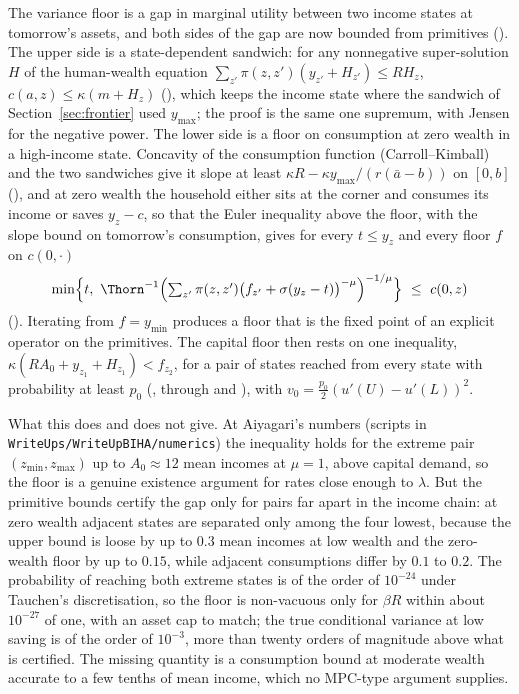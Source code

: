 The variance floor is a gap in marginal utility between two income states at tomorrow's assets,
and both sides of the gap are now bounded from primitives ().
The upper side is a state-dependent sandwich: for any nonnegative super-solution $H$ of the
human-wealth equation $\sum_{z'}\pi(z,z')(y_{z'}+H_{z'})\le RH_z$,
$c(a,z)\le\kappa(m+H_z)$ (), which keeps the
income state where the sandwich of Section~\ref{sec:frontier} used $y_{\max}$; the proof is the
same one supremum, with Jensen for the negative power. The lower side is a floor on consumption at
zero wealth in a high-income state. Concavity of the consumption function (Carroll--Kimball) and
the two sandwiches give it slope at least $\kappa R-\kappa y_{\max}/(r(\bar a-b))$ on $[0,b]$
(), and at zero wealth the household either sits at the corner
and consumes its income or saves $y_z-c$, so that the Euler inequality above the floor, with the
slope bound on tomorrow's consumption, gives for every $t\le y_z$ and every floor $f$ on
$c(0,\cdot)$
\[
  \min\Bigl\{t,\ \Thorn^{-1}\Bigl(\textstyle\sum_{z'}\pi(z,z')\bigl(f_{z'}+\sigma(y_z-t)\bigr)^{-\mu}\Bigr)^{-1/\mu}\Bigr\}
  \ \le\ c(0,z)
\]
(). Iterating from $f=y_{\min}$ produces a floor that is the
fixed point of an explicit operator on the primitives. The capital floor then rests on one
inequality, $\kappa(RA_0+y_{z_1}+H_{z_1})<f_{z_2}$, for a pair of states reached from every state
with probability at least $p_0$ (, through
 and ), with
$v_0=\tfrac{p_0}{2}(u'(U)-u'(L))^2$.

What this does and does not give. At Aiyagari's numbers (scripts in
\texttt{WriteUps/\allowbreak WriteUpBIHA/\allowbreak numerics}) the inequality holds for the extreme pair
$(z_{\min},z_{\max})$ up to $A_0\approx12$ mean incomes at $\mu=1$, above capital demand, so the
floor is a genuine existence argument for rates close enough to $\lambda$. But the primitive
bounds certify the gap only for pairs far apart in the income chain: at zero wealth adjacent
states are separated only among the four lowest, because the upper bound is loose by up to $0.3$
mean incomes at low wealth and the zero-wealth floor by up to $0.15$, while adjacent consumptions
differ by $0.1$ to $0.2$. The probability of reaching both extreme states is of the order of
$10^{-24}$ under Tauchen's discretisation, so the floor is non-vacuous only for $\beta R$ within
about $10^{-27}$ of one, with an asset cap to match; the true conditional variance at low saving
is of the order of $10^{-3}$, more than twenty orders of magnitude above what is certified. The
missing quantity is a consumption bound at moderate wealth accurate to a few tenths of mean
income, which no MPC-type argument supplies.

